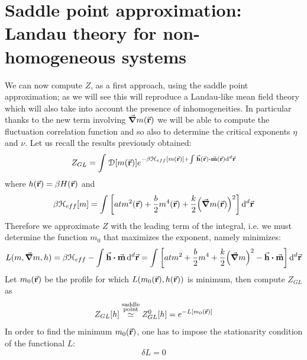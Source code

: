 \documentclass[../../Main/Main.tex]{subfiles}
\begin{document}
\section{Saddle point approximation: Landau theory for non-homogeneous systems}
We can now compute \( Z \), as a first approach, using the saddle point approximation; as we will see this will reproduce a Landau-like mean field theory which will also take into account the presence of inhomogeneities. In particular thanks to the new term involving \( \va{\grad } m (\va{r}) \) we will be able to compute the fluctuation correlation function and so also to determine the critical exponents \( \eta  \) and \( \nu  \). Let us recall the results previously obtained:
\begin{equation*}
  Z_{GL} = \int_{}^{} \mathcal{D} \qty[m(\va{r})]  e^{-  \beta \mathcal{H}_{eff} [m (\va{r})]   + \int_{}^{} \va{h} (\va{r}) \vdot \va{m} (\va{r})  \dd[d]{\va{r}}   }
\end{equation*}
where \( h(\va{r}) = \beta H(\va{r}) \) and
\begin{equation*}
  \beta \mathcal{H}_{eff} [m] = \int_{}^{}  \qty[a t m^2 (\va{r}) + \frac{b}{2} m^4 (\va{r}) + \frac{k}{2} \qty(\va{\grad } m (\va{r}))^2] \dd[d]{\va{r}}
\end{equation*}
Therefore we approximate \( Z \) with the leading term of the integral, i.e. we must determine the function \( m_0 \)  that maximizes the exponent, namely minimizes:
\begin{equation}
  L (m,\va{\grad } m,h) =  \beta \mathcal{H}_{eff}   - \int_{}^{} \va{h}  \vdot \va{m}  \dd[d]{\va{r}} = \int_{}^{}  \qty[a t m^2  + \frac{b}{2} m^4 + \frac{k}{2} \qty(\va{\grad } m )^2 - \va{h}  \vdot \va{m} ] \dd[d]{\va{r}}
\end{equation}
 Let \( m_0 (\va{r}) \) be the profile for which \( L (m_0 (\va{r}), h (\va{r}) ) \) is minimum, then compute \( Z_{GL} \) as
\begin{equation}
  Z_{GL} [h] \overset{\substack{ \text{saddle} \\  \text{point} } }{\simeq } Z_{GL}^0 [h] = e^{- L [m_0 (\va{r})]}
\end{equation}
In order to find the minimum \( m_0 (\va{r}) \), one has to impose the stationarity condition of the functional \( L \): %
\begin{equation}
  \delta L = 0
  \label{eq:17_3}
\end{equation}
\end{document}
